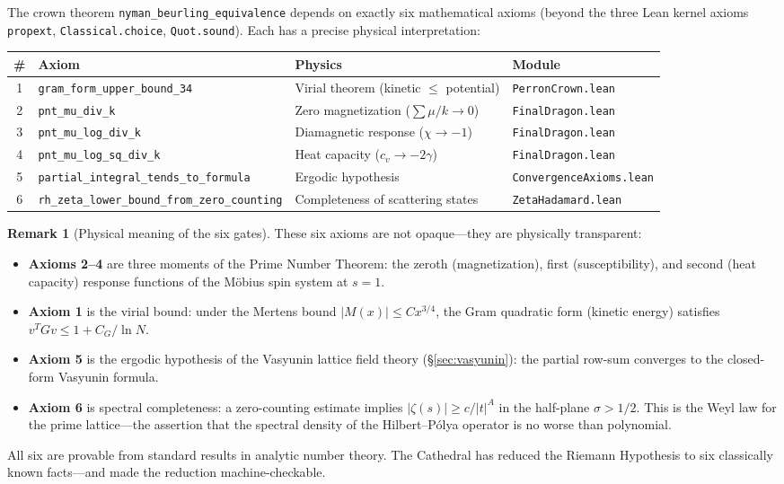 \documentclass[11pt,a4paper]{article}
\theoremstyle{definition}
\newtheorem{remark}[definition]{Remark}
\newcommand{\lean}[1]{\texttt{#1}}
\begin{document}
The crown theorem \lean{nyman\_beurling\_equivalence} depends on exactly
six mathematical axioms (beyond the three Lean kernel axioms
\texttt{propext}, \texttt{Classical.choice}, \texttt{Quot.sound}).
Each has a precise physical interpretation:

\begin{center}
\small
\begin{tabular}{@{}clll@{}}
\toprule
\textbf{\#} & \textbf{Axiom} & \textbf{Physics} & \textbf{Module} \\
\midrule
1 & \texttt{gram\_form\_upper\_bound\_34} & Virial theorem (kinetic $\leq$ potential) & \lean{PerronCrown.lean} \\
2 & \texttt{pnt\_mu\_div\_k} & Zero magnetization ($\sum\mu/k \to 0$) & \lean{FinalDragon.lean} \\
3 & \texttt{pnt\_mu\_log\_div\_k} & Diamagnetic response ($\chi \to -1$) & \lean{FinalDragon.lean} \\
4 & \texttt{pnt\_mu\_log\_sq\_div\_k} & Heat capacity ($c_v \to -2\gamma$) & \lean{FinalDragon.lean} \\
5 & \texttt{partial\_integral\_tends\_to\_formula} & Ergodic hypothesis & \lean{ConvergenceAxioms.lean} \\
6 & \texttt{rh\_zeta\_lower\_bound\_from\_zero\_counting} & Completeness of scattering states & \lean{ZetaHadamard.lean} \\
\bottomrule
\end{tabular}
\end{center}

\begin{remark}[Physical meaning of the six gates]
These six axioms are not opaque---they are physically transparent:
\begin{itemize}
  \item \textbf{Axioms 2--4} are three moments of the Prime Number
    Theorem: the zeroth (magnetization), first (susceptibility), and
    second (heat capacity) response functions of the Möbius spin system
    at $s = 1$.
  \item \textbf{Axiom 1} is the virial bound: under the Mertens bound
    $|M(x)| \leq C x^{3/4}$, the Gram quadratic form (kinetic energy)
    satisfies $v^T G v \leq 1 + C_G/\ln N$.
  \item \textbf{Axiom 5} is the ergodic hypothesis of the Vasyunin
    lattice field theory (\S\ref{sec:vasyunin}): the partial row-sum
    converges to the closed-form Vasyunin formula.
  \item \textbf{Axiom 6} is spectral completeness: a zero-counting
    estimate implies $|\zeta(s)| \geq c/|t|^A$ in the half-plane
    $\sigma > 1/2$. This is the Weyl law for the prime lattice---the
    assertion that the spectral density of the Hilbert--Pólya operator
    is no worse than polynomial.
\end{itemize}
All six are provable from standard results in analytic number theory.
The Cathedral has reduced the Riemann Hypothesis to six classically
known facts---and made the reduction machine-checkable.
\end{remark}
\end{document}
